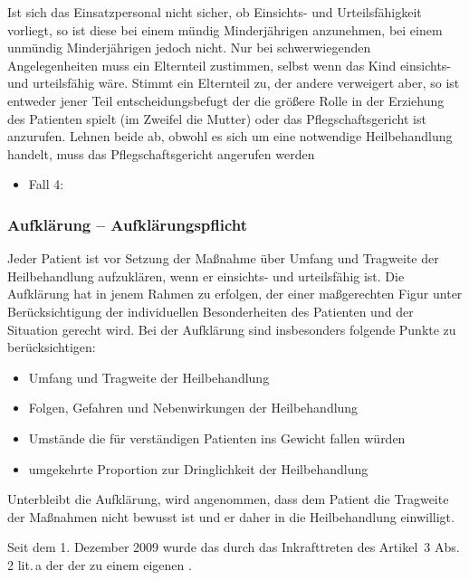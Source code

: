 Ist sich das Einsatzpersonal nicht sicher, ob Einsichts- und
Urteilsfähigkeit vorliegt, so ist diese bei einem mündig
Minderjährigen anzunehmen, bei einem unmündig Minderjährigen
jedoch nicht.
Nur bei schwerwiegenden Angelegenheiten muss ein Elternteil
zustimmen, selbst wenn das Kind einsichts- und urteilsfähig
wäre.
Stimmt ein Elternteil zu, der andere verweigert aber, so ist
entweder jener Teil entscheidungsbefugt der die größere
Rolle in der Erziehung des Patienten spielt (im Zweifel
die Mutter) oder das
Pflegschaftsgericht ist
anzurufen. Lehnen beide ab, obwohl es sich um eine
notwendige Heilbehandlung handelt, muss das
Pflegschaftsgericht angerufen werden


{
\begin{itemize}
  \item Fall 4: 
  \dotfill{}
\end{itemize}
}
{}
{}
{}
{}



\subsubsection{Aufklärung -- Aufklärungspflicht}
\label{topic:aufklaerung}
Jeder Patient ist vor Setzung der Maßnahme über Umfang und
Tragweite der Heilbehandlung aufzuklären, wenn er einsichts-
und urteilsfähig ist. Die Aufklärung hat in jenem Rahmen zu
erfolgen, der einer
maßgerechten Figur unter Berücksichtigung der
individuellen Besonderheiten des Patienten und der
Situation gerecht wird. Bei der Aufklärung sind
insbesonders folgende Punkte zu berücksichtigen:

\begin{itemize}
    \item Umfang und Tragweite der  Heilbehandlung
    \item Folgen, Gefahren und Nebenwirkungen der
    Heilbehandlung
    \item Umstände die für verständigen Patienten ins
    Gewicht fallen würden
    \item umgekehrte Proportion zur Dringlichkeit der
    Heilbehandlung
  \end{itemize}

Unterbleibt die Aufklärung, wird angenommen, dass dem
Patient die Tragweite der Maßnahmen nicht bewusst ist und er
daher  in die Heilbehandlung einwilligt.

Seit dem 1. Dezember 2009 wurde das  durch das Inkrafttreten des Artikel~3 Abs.\,2
lit.\,a der  der  zu einem
eigenen .

